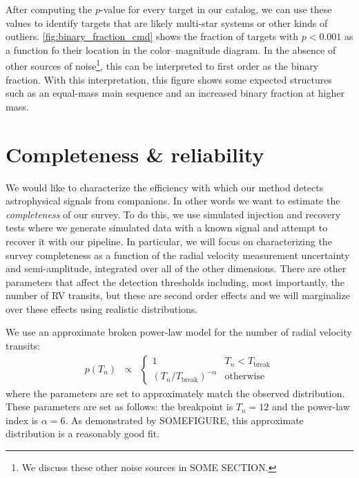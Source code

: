 \documentclass[modern, letterpaper]{aastex631}
\newcommand{\project}[1]{\textsl{#1}}
\newcommand{\Gaia}{\project{Gaia}}
\begin{document}
After computing the $p$-value for every target in our catalog, we can use these values to identify targets that are likely multi-star systems or other kinds of outliers.
\autoref{fig:binary_fraction_cmd} shows the fraction of targets with $p < 0.001$ as a function fo their location in the color--magnitude diagram.
In the absence of other sources of noise\footnote{We discuss these other noise sources in SOME SECTION.}, this can be interpreted to first order as the binary fraction.
With this interpretation, this figure shows some expected structures such as an equal-mass main sequence and an increased binary fraction at higher mass.


\section{Completeness \& reliability}

We would like to characterize the efficiency with which our method detects astrophysical signals from companions.
In other words we want to estimate the \emph{completeness} of our survey.
To do this, we use simulated injection and recovery tests where we generate simulated data with a known signal and attempt to recover it with our pipeline.
In particular, we will focus on characterizing the survey completeness as a function of the radial velocity measurement uncertainty and semi-amplitude, integrated over all of the other dimensions.
There are other parameters that affect the detection thresholds including, most importantly, the number of RV transits, but these are second order effects and we will marginalize over these effects using realistic distributions.

We use an approximate broken power-law model for the number of radial velocity transits:
\begin{eqnarray}
	\label{eq:nb-transits}
	p(T_n) &\propto& \left\{\begin{array}{ll}
		1                                  & T_n < T_\mathrm{break} \\
		(T_n / T_\mathrm{break})^{-\alpha} & \mathrm{otherwise}
	\end{array} \right.
\end{eqnarray}
where the parameters are set to approximately match the observed distribution.
These parameters are set as follows: the breakpoint is $T_n = 12$ and the power-law index is $\alpha = 6$.
As demonstrated by SOMEFIGURE, this approximate distribution is a reasonably good fit.
\end{document}
